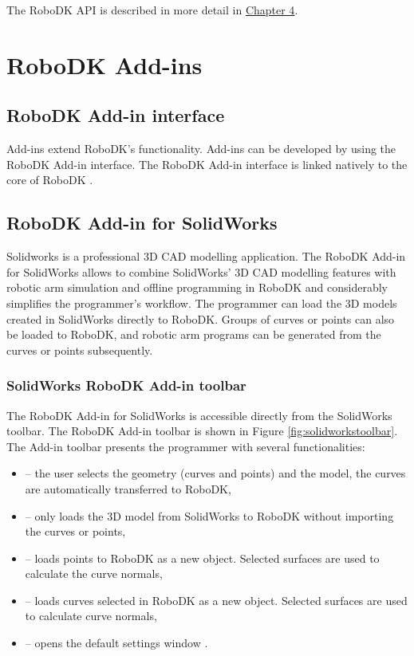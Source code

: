 The RoboDK API is described in more detail in \hyperref[chap:implementation]{Chapter 4}.

\section{RoboDK Add-ins}

\subsection{RoboDK Add-in interface}

Add-ins extend RoboDK's functionality. Add-ins can be developed by using the RoboDK Add-in interface. The RoboDK Add-in interface is linked natively to the core of RoboDK \cite{robodkaddininterface}.

\subsection{RoboDK Add-in for SolidWorks}

Solidworks is a professional 3D CAD modelling application. The RoboDK Add-in for SolidWorks allows to combine SolidWorks' 3D CAD modelling features with robotic arm simulation and offline programming in RoboDK and considerably simplifies the programmer's workflow. The programmer can load the 3D models created in SolidWorks directly to RoboDK. Groups of curves or points can also be loaded to RoboDK, and robotic arm programs can be generated from the curves or points subsequently.

\subsubsection*{SolidWorks RoboDK Add-in toolbar}

The RoboDK Add-in for SolidWorks is accessible directly from the SolidWorks toolbar.  The RoboDK Add-in toolbar is shown in Figure  \ref{fig:solidworkstoolbar}. The Add-in toolbar presents the programmer with several functionalities:

\begin{itemize}
    \item {} -- the user selects the geometry (curves and points) and the model, the curves are automatically transferred to RoboDK,
    \item {} -- only loads the 3D model from SolidWorks to RoboDK without importing the curves or points,
    \item {} -- loads points to RoboDK as a new object. Selected surfaces are used to calculate the curve normals, 
    \item {} --  loads curves selected in RoboDK as a new object. Selected surfaces are used to calculate curve normals, 
    \item {} -- opens the default settings window \cite{robodksolidworks}.
\end{itemize}

